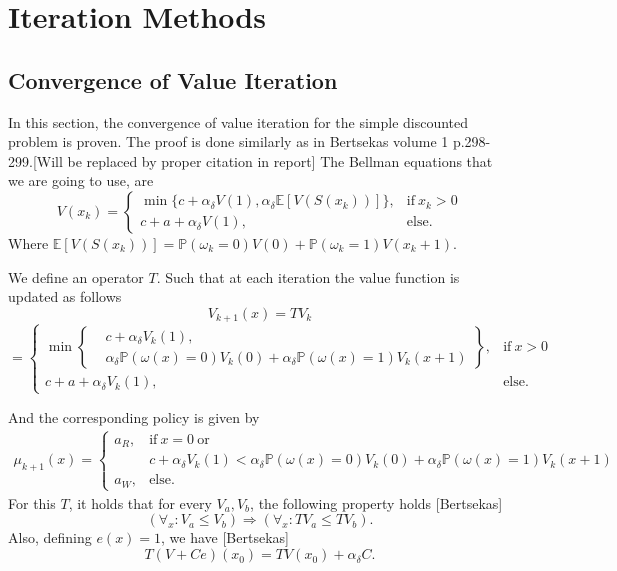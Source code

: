 

\chapter{Iteration Methods}
\section{Convergence of Value Iteration}
In this section, the convergence of value iteration for the simple discounted problem is proven.
The proof is done similarly as in Bertsekas volume 1 p.298-299.[Will be replaced by proper citation in report]
The Bellman equations that we are going to use, are
\begin{equation}
V(x_k)=\begin{cases}
\min\{c+\alpha_\delta V(1),\alpha_\delta \mathbb{E}[V(S(x_k))]\},&\text{if}\ x_k>0 \\
c+a+\alpha_\delta V(1),&\text{else.}
\end{cases}
\end{equation}
Where $\mathbb{E}[V(S(x_k))]=\mathbb{P}(\omega_k=0)V(0)+\mathbb{P}(\omega_k=1)V(x_k+1)$.

We define an operator $T$. Such that at each iteration the value function is updated as follows
$$
V_{k+1}(x)=TV_k
$$
\begin{equation}
=\begin{cases}
\min\left\{\begin{split}
&c+\alpha_\delta V_k(1),\\
&\alpha_\delta\mathbb{P}(\omega(x)=0)V_k(0)+\alpha_\delta\mathbb{P}(\omega(x)=1)V_k(x+1)
\end{split}\right\},&\text{if}\ x>0 \\
c+a+\alpha_\delta V_k(1),&\text{else.}
\end{cases}
\end{equation}

And the corresponding policy is given by
\begin{equation}
\begin{split}
\mu_{k+1}(x)=\begin{cases}
a_R,&\text{if}\ x=0\ \text{or}\\&c+\alpha_\delta V_k(1)<\alpha_\delta\mathbb{P}(\omega(x)=0)V_k(0)+\alpha_\delta\mathbb{P}(\omega(x)=1)V_k(x+1) \\
a_W,&\text{else.}
\end{cases}
\end{split}
\end{equation}
For this $T$, it holds that for every $V_a,V_b$, the following property holds [Bertsekas]
\begin{equation}\label{eq:Tproperty1}
(\forall_x: V_a\leq V_b)\Rightarrow (\forall_x: TV_a\leq TV_b).
\end{equation}
Also, defining $e(x)=1$, we have [Bertsekas]
\begin{equation}\label{eq:Tproperty2}
T(V+Ce)(x_0) = TV(x_0)+\alpha_\delta C.
\end{equation}

